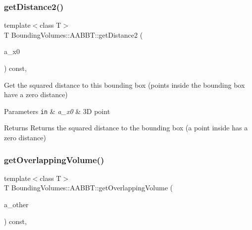 \subsubsection{\texorpdfstring{get\+Distance2()}{getDistance2()}}
{\footnotesize\ttfamily template$<$class T$>$ \\
T Bounding\+Volumes\+::\+A\+A\+B\+B\+T\+::get\+Distance2 (\begin{DoxyParamCaption}\item[{const \hyperlink{classEBGeometry_1_1BoundingVolumes_1_1AABBT_af139f618de2c5138990a63e93eb7d066}{Vec3} \&}]{a\+\_\+x0 }\end{DoxyParamCaption}) const\hspace{0.3cm}{\ttfamily [inline]}, {\ttfamily [noexcept]}}



Get the squared distance to this bounding box (points inside the bounding box have a zero distance) 


\begin{DoxyParams}[1]{Parameters}
\mbox{\tt in}  & {\em a\+\_\+x0} & 3D point \\
\hline
\end{DoxyParams}
\begin{DoxyReturn}{Returns}
Returns the squared distance to the bounding box (a point inside has a zero distance) 
\end{DoxyReturn}
\mbox{\label{classEBGeometry_1_1BoundingVolumes_1_1AABBT_a02d157786ad67971b4873d6c2b33adbf}} 
\subsubsection{\texorpdfstring{get\+Overlapping\+Volume()}{getOverlappingVolume()}}
{\footnotesize\ttfamily template$<$class T$>$ \\
T Bounding\+Volumes\+::\+A\+A\+B\+B\+T\+::get\+Overlapping\+Volume (\begin{DoxyParamCaption}\item[{const \hyperlink{classEBGeometry_1_1BoundingVolumes_1_1AABBT}{A\+A\+B\+BT}$<$ T $>$ \&}]{a\+\_\+other }\end{DoxyParamCaption}) const\hspace{0.3cm}{\ttfamily [inline]}, {\ttfamily [noexcept]}}



